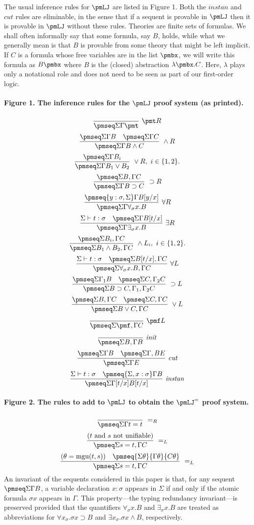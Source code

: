 The usual inference rules for $\pmLJ$ are listed in Figure 1. Both the $\mathit{instan}$ and $\mathit{cut}$ rules are eliminable, in the sense that if a sequent is provable in $\pmLJ$ then it is provable in $\pmLJ$ without these rules.
Theories are finite sets of formulas. We shall often informally say that some formula, say $B$, holds, while what we generally mean is that $B$ is provable from some theory that might be left implicit.
If $C$ is a formula whose free variables are in the list $\pmbx$, we will write this formula as $B\pmbx$ where $B$ is the (closed) abstraction $\lambda\pmbx.C$. Here, $\lambda$ plays only a notational role and does not need to be seen as part of our first-order logic.
\paragraph{Figure 1. The inference rules for the $\pmLJ$ proof system (as printed).}
\[\frac{}{\pmseq\Sigma\Gamma\pmt}\ \pmt R\]
\[
\frac{\pmseq\Sigma\Gamma B\quad\pmseq\Sigma\Gamma C}{\pmseq\Sigma\Gamma{B\wedge C}}\ \wedge R\]
\[
\frac{\pmseq\Sigma\Gamma{B_i}}{\pmseq\Sigma\Gamma{B_1\vee B_2}}\ \vee R,\ i\in\{1,2\}.\]
\[\frac{\pmseq\Sigma{B,\Gamma}C}{\pmseq\Sigma\Gamma{B\supset C}}\ \supset R\]
\[
\frac{\pmseq{y:\sigma,\Sigma}\Gamma{B[y/x]}}{\pmseq\Sigma\Gamma{\forall_\sigma x.B}}\ \forall R\]
\[\frac{\Sigma\vdash t:\sigma\quad\pmseq\Sigma\Gamma{B[t/x]}}{\pmseq\Sigma\Gamma{\exists_\sigma x.B}}\ \exists R\]
\[
\frac{\pmseq\Sigma{B_i,\Gamma}C}{\pmseq\Sigma{B_1\wedge B_2,\Gamma}C}\ \wedge L_i,\ i\in\{1,2\}.\]
\[\frac{\Sigma\vdash t:\sigma\quad\pmseq\Sigma{B[t/x],\Gamma}C}{\pmseq\Sigma{\forall_\sigma x.B,\Gamma}C}\ \forall L\]
\[\frac{\pmseq\Sigma{\Gamma_1}B\quad\pmseq\Sigma{C,\Gamma_2}C}{\pmseq\Sigma{B\supset C,\Gamma_1,\Gamma_2}C}\ \supset L\]
\[
\frac{\pmseq\Sigma{B,\Gamma}C\quad\pmseq\Sigma{C,\Gamma}C}{\pmseq\Sigma{B\vee C,\Gamma}C}\ \vee L\]
\[
\frac{}{\pmseq\Sigma{\pmf,\Gamma}C}\ \pmf L\]
\[\frac{}{\pmseq\Sigma{B,\Gamma}B}\ \mathit{init}\]
\[
\frac{\pmseq\Sigma\Gamma B\quad\pmseq\Sigma{\Gamma,B}E}{\pmseq\Sigma\Gamma E}\ \mathit{cut}\]
\[\frac{\Sigma\vdash t:\sigma\quad\pmseq{\Sigma,x:\sigma}\Gamma B}{\pmseq\Sigma{\Gamma[t/x]}{B[t/x]}}\ \mathit{instan}\]
\paragraph{Figure 2. The rules to add to $\pmLJ$ to obtain the $\pmLJ^=$ proof system.}
\[\frac{}{\pmseq\Sigma\Gamma{t=t}}\ =_R\]
\[
\frac{(t\text{ and }s\text{ not unifiable})}{\pmseq\Sigma{s=t,\Gamma}C}\ =_L\]
\[\frac{(\theta=\operatorname{mgu}(t,s))\quad\pmseq{\Sigma\theta}{\Gamma\theta}{C\theta}}{\pmseq\Sigma{s=t,\Gamma}C}\ =_L\]
An invariant of the sequents considered in this paper is that, for any sequent $\pmseq\Sigma\Gamma B$, a variable declaration $x:\sigma$ appears in $\Sigma$ if and only if the atomic formula $\sigma x$ appears in $\Gamma$. This property---the typing redundancy invariant---is preserved provided that the quantifiers $\forall_\sigma x.B$ and $\exists_\sigma x.B$ are treated as abbreviations for $\forall x_\sigma.\sigma x\supset B$ and $\exists x_\sigma.\sigma x\wedge B$, respectively.
